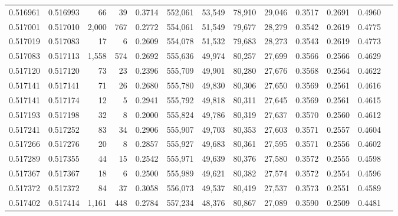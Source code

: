 \begin{tabular}{rrrrrrrrrrrrr}
0.516961 & 0.516993 &    66 &    39 &                                     0.3714 & 552,061 &  53,549 &  78,910 &  29,046 & 0.3517 & 0.2691 & 0.4960 \\
0.517001 & 0.517010 & 2,000 &   767 &                                     0.2772 & 554,061 &  51,549 &  79,677 &  28,279 & 0.3542 & 0.2619 & 0.4775 \\
0.517019 & 0.517083 &    17 &     6 &                                     0.2609 & 554,078 &  51,532 &  79,683 &  28,273 & 0.3543 & 0.2619 & 0.4773 \\
0.517083 & 0.517113 & 1,558 &   574 &                                     0.2692 & 555,636 &  49,974 &  80,257 &  27,699 & 0.3566 & 0.2566 & 0.4629 \\
0.517120 & 0.517120 &    73 &    23 &                                     0.2396 & 555,709 &  49,901 &  80,280 &  27,676 & 0.3568 & 0.2564 & 0.4622 \\
0.517141 & 0.517141 &    71 &    26 &                                     0.2680 & 555,780 &  49,830 &  80,306 &  27,650 & 0.3569 & 0.2561 & 0.4616 \\
0.517141 & 0.517174 &    12 &     5 &                                     0.2941 & 555,792 &  49,818 &  80,311 &  27,645 & 0.3569 & 0.2561 & 0.4615 \\
0.517193 & 0.517198 &    32 &     8 &                                     0.2000 & 555,824 &  49,786 &  80,319 &  27,637 & 0.3570 & 0.2560 & 0.4612 \\
0.517241 & 0.517252 &    83 &    34 &                                     0.2906 & 555,907 &  49,703 &  80,353 &  27,603 & 0.3571 & 0.2557 & 0.4604 \\
0.517266 & 0.517276 &    20 &     8 &                                     0.2857 & 555,927 &  49,683 &  80,361 &  27,595 & 0.3571 & 0.2556 & 0.4602 \\
0.517289 & 0.517355 &    44 &    15 &                                     0.2542 & 555,971 &  49,639 &  80,376 &  27,580 & 0.3572 & 0.2555 & 0.4598 \\
0.517367 & 0.517367 &    18 &     6 &                                     0.2500 & 555,989 &  49,621 &  80,382 &  27,574 & 0.3572 & 0.2554 & 0.4596 \\
0.517372 & 0.517372 &    84 &    37 &                                     0.3058 & 556,073 &  49,537 &  80,419 &  27,537 & 0.3573 & 0.2551 & 0.4589 \\
0.517402 & 0.517414 & 1,161 &   448 &                                     0.2784 & 557,234 &  48,376 &  80,867 &  27,089 & 0.3590 & 0.2509 & 0.4481 \\

\end{tabular}
